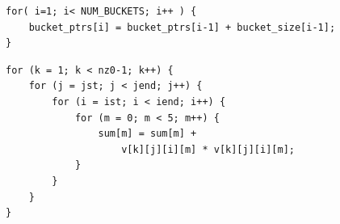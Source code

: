 \begin{lstlisting}[caption={\textit{SNU\_NAS/IS/is.c:468}. Algorithmically parallelizible problem ends up hidden from compiler behind unsuccessful implementation. Metrics: \textit{iterator-payload-non-cf-cohesion}: 0.0566, \textit{iterator-payload-total-cohesion}: 0.3208, \textit{loop-critical-payload-fraction}: 0.2143, \textit{loop-payload-fraction}: 0.6087}, captionpos=b, label=lst:non-parallel-4, float, floatplacement=H, mathescape=true]    
for( i=1; i< NUM_BUCKETS; i++ ) {  
	bucket_ptrs[i] = bucket_ptrs[i-1] + bucket_size[i-1];
}
\end{lstlisting}

\begin{lstlisting}[caption={\textit{SNU\_NAS/LU/src/l2norm.c:57}. Intel compiler refuses to parallelize that reduction problem due to assumed true and anti dependencies between memory references to different sum and v arrays. Inner loop metrics: \textit{iterator-payload-non-cf-cohesion}: 0.0331, \textit{iterator-payload-total-cohesion}: 0.3967, \textit{loop-critical-payload-fraction}: 0.1364, \textit{loop-payload-fraction}: 0.8148}, captionpos=b, label=lst:non-parallel-5, float, floatplacement=H, mathescape=true] 
for (k = 1; k < nz0-1; k++) {
	for (j = jst; j < jend; j++) {
		for (i = ist; i < iend; i++) {
			for (m = 0; m < 5; m++) {
				sum[m] = sum[m] + 
					v[k][j][i][m] * v[k][j][i][m];
			}
		}
	}
}
\end{lstlisting}

